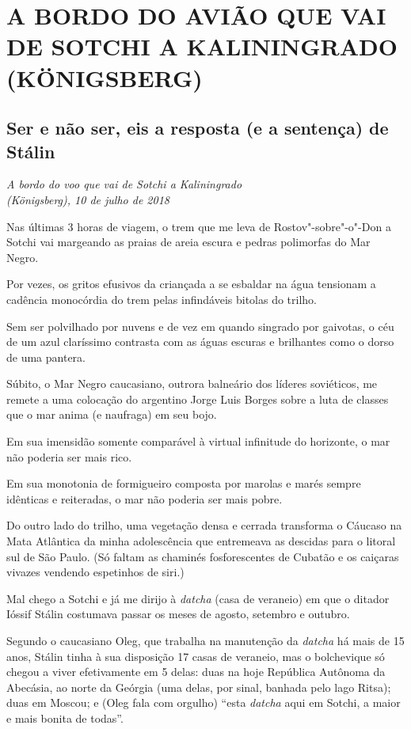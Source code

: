 \part{A BORDO DO AVIÃO QUE VAI DE SOTCHI A KALININGRADO (KÖNIGSBERG)}

\chapter*{Ser e não ser, eis a resposta (e a sentença) de Stálin}

\begin{flushright}
\emph{A bordo do voo que vai de Sotchi a Kaliningrado\\(Königsberg), 10 de julho de 2018}
\end{flushright}

Nas últimas 3 horas de viagem, o trem que me leva de Rostov"-sobre"-o"-Don
a Sotchi vai margeando as praias de areia escura e pedras polimorfas do
Mar Negro.

Por vezes, os gritos efusivos da criançada a se esbaldar na água
tensionam a cadência monocórdia do trem pelas infindáveis bitolas do
trilho.

Sem ser polvilhado por nuvens e de vez em quando singrado por gaivotas,
o céu de um azul claríssimo contrasta com as águas escuras e brilhantes
como o dorso de uma pantera.

Súbito, o Mar Negro caucasiano, outrora balneário dos líderes
soviéticos, me remete a uma colocação do argentino Jorge Luis Borges
sobre a luta de classes que o mar anima (e naufraga) em seu bojo.

Em sua imensidão somente comparável à virtual infinitude do horizonte, o
mar não poderia ser mais rico.

Em sua monotonia de formigueiro composta por marolas e marés sempre
idênticas e reiteradas, o mar não poderia ser mais pobre.

Do outro lado do trilho, uma vegetação densa e cerrada transforma o
Cáucaso na Mata Atlântica da minha adolescência que entremeava as
descidas para o litoral sul de São Paulo. (Só faltam as chaminés
fosforescentes de Cubatão e os caiçaras vivazes vendendo espetinhos de
siri.)

Mal chego a Sotchi e já me dirijo à \emph{datcha} (casa de veraneio) em
que o ditador Ióssif Stálin costumava passar os meses de agosto,
setembro e outubro.

Segundo o caucasiano Oleg, que trabalha na manutenção da \emph{datcha}
há mais de 15 anos, Stálin tinha à sua disposição 17 casas de veraneio,
mas o bolchevique só chegou a viver efetivamente em 5 delas: duas na
hoje República Autônoma da Abecásia, ao norte da Geórgia (uma delas, por
sinal, banhada pelo lago Ritsa); duas em Moscou; e (Oleg fala com
orgulho) ``esta \emph{datcha} aqui em Sotchi, a maior e mais bonita de
todas''.

